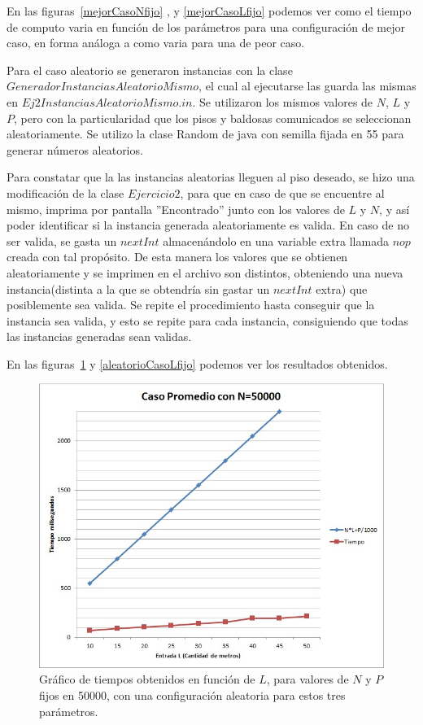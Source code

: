 En las figuras~\ref{mejorCasoNfijo} , y \ref{mejorCasoLfijo} podemos ver como el tiempo de computo varia en función de los parámetros para una configuración de mejor caso, en forma análoga a como varia para una de peor caso.

Para el caso aleatorio se generaron instancias con la clase $ GeneradorInstanciasAleatorioMismo $, el cual al ejecutarse las guarda las mismas en $ Ej2InstanciasAleatorioMismo.in $. Se utilizaron los mismos valores de $ N $, $ L $ y $ P $, pero con la particularidad que los pisos y baldosas comunicados se seleccionan aleatoriamente. Se utilizo la clase Random de java con semilla fijada en 55 para generar números aleatorios.

Para constatar que la las instancias aleatorias lleguen al piso deseado, se hizo una modificación de la clase $ Ejercicio2 $, para que en caso de que se encuentre al mismo, imprima por pantalla ''Encontrado'' junto con los valores de $ L $ y $ N $, y así poder identificar si la instancia generada aleatoriamente es valida. En caso de no ser valida, se gasta un $ nextInt $ almacenándolo en una variable extra llamada $ nop $ creada con tal propósito. De esta manera los valores que se obtienen aleatoriamente y se imprimen en el archivo son distintos, obteniendo una nueva instancia(distinta a la que se obtendría sin gastar un $ nextInt $ extra) que posiblemente sea valida. Se repite el procedimiento hasta conseguir que la instancia sea valida, y esto se repite para cada instancia, consiguiendo que todas las instancias generadas sean validas.

En las figuras~\ref{aleatorioCasoNfijo} y \ref{aleatorioCasoLfijo} podemos ver los resultados obtenidos.

\begin{figure}[H]
\centering
\includegraphics[scale=0.6]{../CasoPromedioEj2Nfijo.jpg}
\caption{Gráfico de tiempos obtenidos en función de $L$, para valores de $ N $ y $ P $ fijos en 50000, con una configuración aleatoria para estos tres parámetros.}
\label{aleatorioCasoNfijo}
\end{figure}

